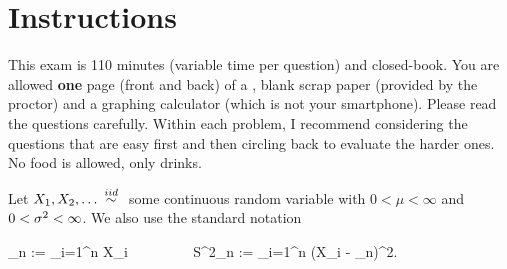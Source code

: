 \documentclass[12pt]{article}
\begin{document}
\section*{Instructions}
This exam is 110 minutes (variable time per question) and closed-book. You are allowed \textbf{one} page (front and back) of a , blank scrap paper (provided by the proctor) and a graphing calculator (which is not your smartphone). Please read the questions carefully. Within each problem, I recommend considering the questions that are easy first and then circling back to evaluate the harder ones. No food is allowed, only drinks. %

\pagebreak

\problem Let $X_1, X_2, \ldots \iid$ some continuous random variable with $0 < \mu < \infty$ and $0 < \sigma^2 < \infty$. We also use the standard notation 

\beqn
\Xbar_n := \sum_{i=1}^n X_i ~~~~~~~~ S^2_n :=  \sum_{i=1}^n (X_i - \Xbar_n)^2.
\eeqn
\end{document}
